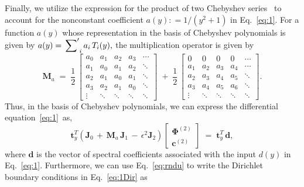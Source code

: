 \documentclass[%
secnumarabic,%
 amssymb, amsmath,%
 aps,prf,superscriptaddress,longbibliography
frontmatterverbose,
]{revtex4-2}
\newcommand{\DefinedAs}[0]{\mathrel{\mathop:}=}
\begin{document}
Finally, we utilize the expression for the product of two Chebyshev series~\cite{OlvTowSIAM2013,DuSIAM2016} to account for the nonconstant coefficient $a(y) \DefinedAs 1/(y^2 + 1)$ in Eq.~\eqref{eq:1}. For a function $a(y)$ whose representation in the basis of Chebyshev polynomials is given by
	$
  a(y) 
  =
  \sideset{}{'}\sum_{i} a_i \, T_i(y),
	$
the multiplication operator is given by
\begin{equation}
	\label{eq:M}
  {\mathbf M}_a 
  \;=\; 
  \dfrac{1}{2}
  \,
  \left[\begin{array}{ccccc}
    a_0 & a_1 & a_2 & a_3 & \cdots\\
    a_1 & a_0 & a_1 & a_2 & \ddots\\
    a_2 & a_1 & a_0 & a_1 & \ddots\\
    a_3 & a_2 & a_1 & a_0 & \ddots\\
    \vdots & \ddots & \ddots & \ddots& \ddots
  \end{array}\right] 
  \;+\; 
  \dfrac{1}{2} 
  \, 
  \left[\begin{array}{ccccc}
    0 & 0 & 0 & 0 & \cdots\\
    a_1 & a_2 & a_3 & a_4 & \cdots\\
    a_2 & a_3 & a_4 & a_5 & \ddots\\
    a_3 & a_4 & a_5 & a_6 & \ddots\\
    \vdots & \ddots & \ddots & \ddots& \ddots
  \end{array}\right].
\end{equation}
Thus, in the basis of Chebyshev polynomials, we can express the differential equation~\eqref{eq:1}~as,
  \begin{equation}
  \label{eq:rndDiff}
  \mathbf t_y^T  \left( \mathbf J_0 \,+\, {\mathbf M}_a\, \mathbf J_1\, - \, \epsilon^2 \mathbf J_2 \right)
  \left[\begin{array}{c} \boldsymbol \Phi^{(2)} \\ \mathbf c^{(2)}  \end{array}\right] 
  \;=\;  
  \mathbf t_y^T \, \mathbf d, 
  \end{equation}
where $\mathbf d$ is the vector of spectral coefficients associated with the input $d (y)$ in Eq.~\eqref{eq:1}. Furthermore, we can use Eq.~\eqref{eq:rndu} to write the Dirichlet boundary conditions in Eq.~\eqref{eq:1Dir} as
\end{document}
